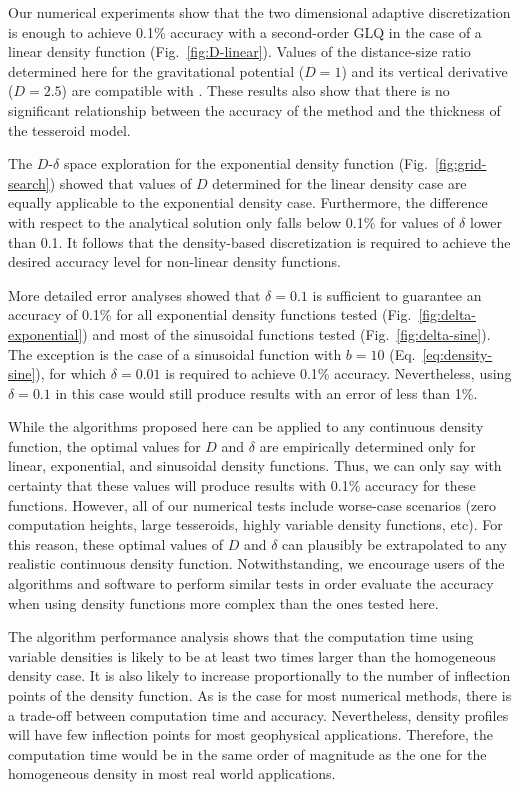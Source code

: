 Our numerical experiments show that the two dimensional adaptive discretization is
enough to achieve 0.1\% accuracy with a second-order GLQ in the case of a linear density
function (Fig.~\ref{fig:D-linear}).
Values of the distance-size ratio determined here for the gravitational potential
($D=1$) and its vertical derivative ($D=2.5$) are compatible with \citet{uieda2016}.
These results also show that there is no significant relationship between the accuracy
of the method and the thickness of the tesseroid model.

The $D$-$\delta$ space exploration for the exponential density function
(Fig.~\ref{fig:grid-search}) showed that values of $D$ determined for the linear density
case are equally applicable to the exponential density case.
Furthermore, the difference with respect to the analytical solution only falls below
0.1\% for values of $\delta$ lower than 0.1.
It follows that the density-based discretization is required to achieve the desired
accuracy level for non-linear density functions.

More detailed error analyses showed that $\delta = 0.1$ is sufficient to guarantee an
accuracy of 0.1\% for all exponential density functions tested
(Fig.~\ref{fig:delta-exponential})
and most of the sinusoidal functions tested (Fig.~\ref{fig:delta-sine}).
The exception is the case of a sinusoidal function with $b = 10$
(Eq.~\ref{eq:density-sine}), for which $\delta = 0.01$ is required to achieve 0.1\%
accuracy.
Nevertheless, using $\delta = 0.1$ in this case would still produce results with an
error of less than 1\%.

While the algorithms proposed here can be applied to any continuous density function,
the optimal values for $D$ and $\delta$ are empirically determined only for linear,
exponential, and sinusoidal density functions.
Thus, we can only say with certainty that these values will produce results with 0.1\%
accuracy for these functions.
However, all of our numerical tests include worse-case scenarios (zero computation
heights, large tesseroids, highly variable density functions, etc).
For this reason, these optimal values of $D$ and $\delta$ can plausibly be
extrapolated to any realistic continuous density function.
Notwithstanding, we encourage users of the algorithms and software to perform similar
tests in order evaluate the accuracy when using density functions more complex than the
ones tested here.

The algorithm performance analysis shows that the computation time using variable
densities is likely to be at least two times larger than the homogeneous density case.
It is also likely to increase proportionally to the number of inflection points of the
density function.
As is the case for most numerical methods, there is a trade-off between computation time
and accuracy.
Nevertheless, density profiles will have few inflection points for most geophysical
applications.
Therefore, the computation time would be in the same order of
magnitude as the one for the homogeneous density in most real world applications.

